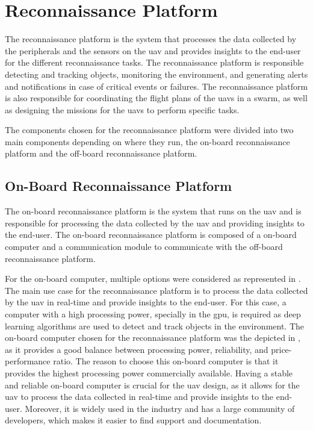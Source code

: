 \section{Reconnaissance Platform}\label{sec:design_reconnaissance_platform}

The reconnaissance platform is the system that processes the data collected by the peripherals and the sensors on the \gls{uav} and provides insights to the end-user for the different reconnaissance tasks. The reconnaissance platform is responsible detecting and tracking objects, monitoring the environment, and generating alerts and notifications in case of critical events or failures. The reconnaissance platform is also responsible for coordinating the flight plans of the \glspl{uav} in a swarm, as well as designing the missions for the \glspl{uav} to perform specific tasks.

The components chosen for the reconnaissance platform were divided into two main components depending on where they run, the on-board reconnaissance platform and the off-board reconnaissance platform.

\subsection{On-Board Reconnaissance Platform}\label{subsec:on-board_reconnaissance_platform}

The on-board reconnaissance platform is the system that runs on the \gls{uav} and is responsible for processing the data collected by the \gls{uav} and providing insights to the end-user. The on-board reconnaissance platform is composed of a on-board computer and a communication module to communicate with the off-board reconnaissance platform.

For the on-board computer, multiple options were considered as represented in . The main use case for the reconnaissance platform is to process the data collected by the \gls{uav} in real-time and provide insights to the end-user. For this case, a computer with a high processing power, specially in the \gls{gpu}, is required as deep learning algorithms are used to detect and track objects in the environment. The on-board computer chosen for the reconnaissance platform was the  depicted in , as it provides a good balance between processing power, reliability, and price-performance ratio. The reason to choose this on-board computer is that it provides the highest processing power commercially available. Having a stable and reliable on-board computer is crucial for the \gls{uav} design, as it allows for the \gls{uav} to process the data collected in real-time and provide insights to the end-user. Moreover, it is widely used in the industry and has a large community of developers, which makes it easier to find support and documentation.

